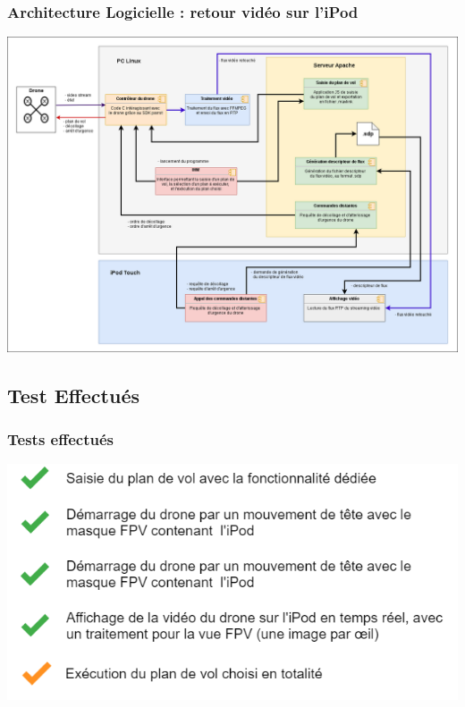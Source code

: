 \documentclass{beamer}
\begin{document}

	\begin{frame}
		\begin{center}
		\frametitle{Architecture Logicielle : retour vidéo sur l'iPod}

       
        \includegraphics[scale=0.24]{04_archi_logicielle_complete.png}
		\end{center}
	\end{frame}
	
	
	
	\begin{frame}
		\section{Test Effectués}
		\begin{center}
		\frametitle{Tests effectués}
           	\includegraphics[scale=0.5]{tests.png}
		\end{center}
	\end{frame}
\end{document}
